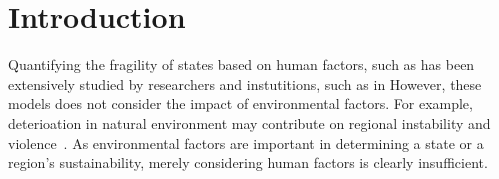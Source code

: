 \section{Introduction}	

Quantifying the fragility of states based on human factors, such as  has been extensively studied by researchers and instutitions, such as in  However, these models does not consider the impact of environmental factors. For example, deterioation in natural environment may contribute on regional instability and violence~. As environmental factors are important in determining a state or a region's sustainability, merely considering human factors is clearly insufficient. 

